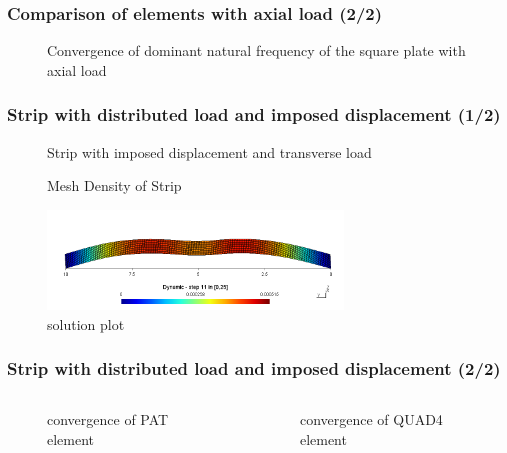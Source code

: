 \documentclass[9pt]{beamer}
\begin{document}
\begin{frame}\frametitle{Comparison of elements with axial load (2/2)}
\begin{figure}


\caption{Convergence of dominant natural frequency of the square plate with axial load}
\end{figure}
\end{frame}


\begin{frame}\frametitle{Strip with distributed load and imposed displacement (1/2)}
\begin{figure}[h!]
\centering

\caption{Strip with imposed displacement and transverse load}
\label{fig:Strip_LOAD_FvsD1}
\end{figure}
\begin{figure}[h!]
\centering

\caption{Mesh Density of Strip}
\label{fig:Strip_Mesh_Density}
\end{figure}
\begin{figure}[h!]
\centering
\includegraphics[trim={0cm 3cm 0cm 1cm},clip,width=0.7\textwidth]{images/FvsD_F.png}
\caption{solution plot}
\label{fig:Strip_Mesh_Density}
\end{figure}
\end{frame}


\begin{frame}\frametitle{Strip with distributed load and imposed displacement (2/2)}

\begin{columns}
\begin{figure}



\caption{convergence of PAT element}
\end{figure}
\begin{figure}


\caption{convergence of QUAD4 element}
\end{figure}
\end{columns}

\end{frame}
\end{document}
